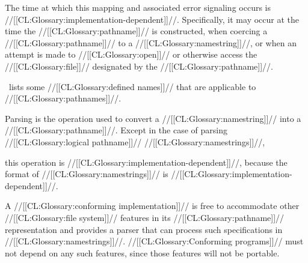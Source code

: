 The time at which this mapping and associated error signaling  occurs is //[[CL:Glossary:implementation-dependent]]//. Specifically, it may occur 
    at the time the //[[CL:Glossary:pathname]]// is constructed,
    when coercing a //[[CL:Glossary:pathname]]// to a //[[CL:Glossary:namestring]]//,
 or when an attempt is made to //[[CL:Glossary:open]]// or otherwise access the //[[CL:Glossary:file]]// 
     designated by the //[[CL:Glossary:pathname]]//.

\Thenextfigure\ lists some //[[CL:Glossary:defined names]]// that are applicable to //[[CL:Glossary:pathnames]]//.

 \endSubsection%


Parsing is the operation used to convert a //[[CL:Glossary:namestring]]// into a //[[CL:Glossary:pathname]]//.  Except in the case of parsing //[[CL:Glossary:logical pathname]]// //[[CL:Glossary:namestrings]]//,

this operation is //[[CL:Glossary:implementation-dependent]]//, because the format of //[[CL:Glossary:namestrings]]// is //[[CL:Glossary:implementation-dependent]]//.

A //[[CL:Glossary:conforming implementation]]// is free to accommodate other //[[CL:Glossary:file system]]// features in its //[[CL:Glossary:pathname]]// representation and provides a parser that can process  such specifications in //[[CL:Glossary:namestrings]]//.   //[[CL:Glossary:Conforming programs]]// must not depend on any such features,  since those features will not be portable.

\endSubsection%
